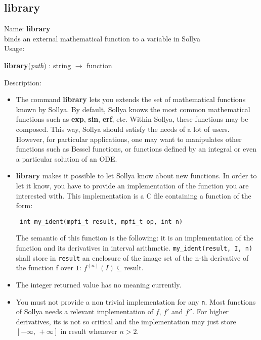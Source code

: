 \subsection{ library }
\noindent Name: \textbf{library}\\
binds an external mathematical function to a variable in Sollya\\

\noindent Usage: 
\begin{center}
\textbf{library}(\emph{path}) : \textsf{string} $\rightarrow$ \textsf{function}\\
\end{center}
\noindent Description: \begin{itemize}

\item The command \textbf{library} lets you extends the set of mathematical
   functions known by Sollya.
   By default, Sollya knows the most common mathematical functions such
   as \textbf{exp}, \textbf{sin}, \textbf{erf}, etc. Within Sollya, these functions may be
   composed. This way, Sollya should satisfy the needs of a lot of
   users. However, for particular applications, one may want to
   manipulates other functions such as Bessel functions, or functions
   defined by an integral or even a particular solution of an ODE.

\item \textbf{library} makes it possible to let Sollya know about new functions. In
   order to let it know, you have to provide an implementation of the
   function you are interested with. This implementation is a C file containing
   a function of the form:
   \begin{verbatim} int my_ident(mpfi_t result, mpfi_t op, int n)\end{verbatim}
   The semantic of this function is the following: it is an implementation of
   the function and its derivatives in interval arithmetic.
   \verb|my_ident(result, I, n)| shall store in \verb|result| an enclosure 
   of the image set of the n-th derivative
   of the function f over \verb|I|: $f^{(n)}(I) \subseteq \mathrm{result}$.

\item The integer returned value has no meaning currently.

\item You must not provide a non trivial implementation for any \verb|n|. Most functions
   of Sollya needs a relevant implementation of $f$, $f'$ and $f''$. For higher 
   derivatives, its is not so critical and the implementation may just store 
   $[-\infty,\,+\infty]$ in result whenever $n>2$.


\end{itemize}
